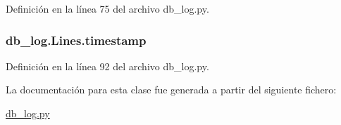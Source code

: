 Definición en la línea 75 del archivo db\-\_\-log.\-py.

\hypertarget{classdb__log_1_1_lines_ac55c8876ae06fae44dab728313506935}{
\subsubsection[{timestamp}]{\setlength{\rightskip}{0pt plus 5cm}db\-\_\-log.\-Lines.\-timestamp}}\label{classdb__log_1_1_lines_ac55c8876ae06fae44dab728313506935}


Definición en la línea 92 del archivo db\-\_\-log.\-py.



La documentación para esta clase fue generada a partir del siguiente fichero\-:\begin{DoxyCompactItemize}
\item 
\hyperlink{db__log_8py}{db\-\_\-log.\-py}\end{DoxyCompactItemize}
